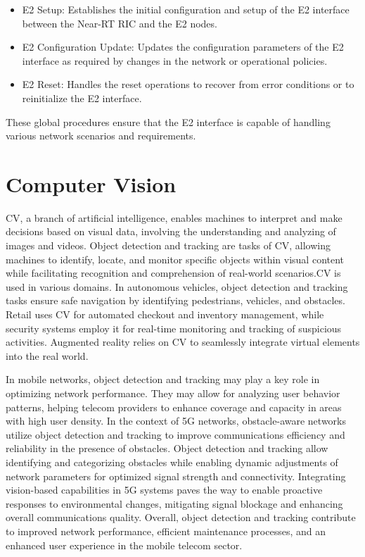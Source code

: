 \begin{itemize}
\item E2 Setup: Establishes the initial configuration and setup of the E2 interface between the Near-RT RIC and the E2 nodes.
\item E2 Configuration Update: Updates the configuration parameters of the E2 interface as required by changes in the network or operational policies.
\item E2 Reset: Handles the reset operations to recover from error conditions or to reinitialize the E2 interface.
\end{itemize}
These global procedures ensure that the E2 interface is capable of handling various network scenarios and requirements.



\section{Computer Vision}\label{sec:CV}

CV, a branch of artificial intelligence, enables machines to interpret and make decisions based on visual data, involving the understanding and analyzing of images and videos.
Object detection and tracking are tasks of CV, allowing machines to identify, locate, and monitor specific objects within visual content while facilitating recognition and comprehension of real-world scenarios.CV is used in various domains.
In autonomous vehicles, object detection and tracking tasks ensure safe navigation by identifying pedestrians, vehicles, and obstacles.
Retail uses CV for automated checkout and inventory management, while security systems employ it for real-time monitoring and tracking of suspicious activities.
Augmented reality relies on CV to seamlessly integrate virtual elements into the real world.

In mobile networks, object detection and tracking may play a key role in optimizing network performance.
They may allow for analyzing user behavior patterns, helping telecom providers to enhance coverage and capacity in areas with high user density.
In the context of 5G networks, obstacle-aware networks utilize object detection and tracking to improve communications efficiency and reliability in the presence of obstacles.
Object detection and tracking allow identifying and categorizing obstacles while enabling dynamic adjustments of network parameters for optimized signal strength and connectivity.
Integrating vision-based capabilities in 5G systems paves the way to enable proactive responses to environmental changes, mitigating signal blockage and enhancing overall communications quality.
Overall, object detection and tracking contribute to improved network performance, efficient maintenance processes, and an enhanced user experience in the mobile telecom sector.

